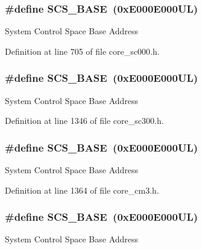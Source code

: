 \subsubsection[{\texorpdfstring{S\+C\+S\+\_\+\+B\+A\+SE}{SCS_BASE}}]{\setlength{\rightskip}{0pt plus 5cm}\#define S\+C\+S\+\_\+\+B\+A\+SE~(0x\+E000\+E000\+U\+L)}\hypertarget{group___c_m_s_i_s__core__base_ga3c14ed93192c8d9143322bbf77ebf770}{}\label{group___c_m_s_i_s__core__base_ga3c14ed93192c8d9143322bbf77ebf770}
System Control Space Base Address 

Definition at line 705 of file core\+\_\+sc000.\+h.

\subsubsection[{\texorpdfstring{S\+C\+S\+\_\+\+B\+A\+SE}{SCS_BASE}}]{\setlength{\rightskip}{0pt plus 5cm}\#define S\+C\+S\+\_\+\+B\+A\+SE~(0x\+E000\+E000\+U\+L)}\hypertarget{group___c_m_s_i_s__core__base_ga3c14ed93192c8d9143322bbf77ebf770}{}\label{group___c_m_s_i_s__core__base_ga3c14ed93192c8d9143322bbf77ebf770}
System Control Space Base Address 

Definition at line 1346 of file core\+\_\+sc300.\+h.

\subsubsection[{\texorpdfstring{S\+C\+S\+\_\+\+B\+A\+SE}{SCS_BASE}}]{\setlength{\rightskip}{0pt plus 5cm}\#define S\+C\+S\+\_\+\+B\+A\+SE~(0x\+E000\+E000\+U\+L)}\hypertarget{group___c_m_s_i_s__core__base_ga3c14ed93192c8d9143322bbf77ebf770}{}\label{group___c_m_s_i_s__core__base_ga3c14ed93192c8d9143322bbf77ebf770}
System Control Space Base Address 

Definition at line 1364 of file core\+\_\+cm3.\+h.

\subsubsection[{\texorpdfstring{S\+C\+S\+\_\+\+B\+A\+SE}{SCS_BASE}}]{\setlength{\rightskip}{0pt plus 5cm}\#define S\+C\+S\+\_\+\+B\+A\+SE~(0x\+E000\+E000\+U\+L)}\hypertarget{group___c_m_s_i_s__core__base_ga3c14ed93192c8d9143322bbf77ebf770}{}\label{group___c_m_s_i_s__core__base_ga3c14ed93192c8d9143322bbf77ebf770}
System Control Space Base Address 

